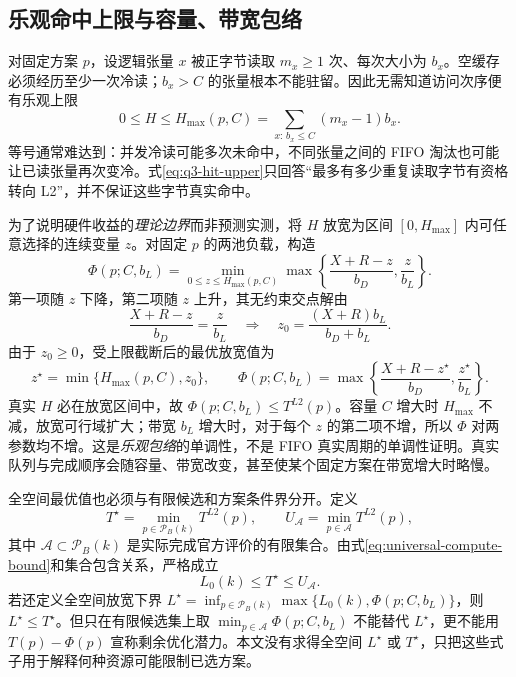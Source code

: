 \subsection{乐观命中上限与容量、带宽包络}
对固定方案 $p$，设逻辑张量 $x$ 被正字节读取 $m_x\ge1$ 次、每次大小为 $b_x$。空缓存必须经历至少一次冷读；$b_x>C$ 的张量根本不能驻留。因此无需知道访问次序便有乐观上限
\begin{equation}\label{eq:q3-hit-upper}
0\le H\le H_{\max}(p,C)=
\sum_{x:\,b_x\le C}(m_x-1)b_x.
\end{equation}
等号通常难达到：并发冷读可能多次未命中，不同张量之间的 FIFO 淘汰也可能让已读张量再次变冷。式\eqref{eq:q3-hit-upper}只回答“最多有多少重复读取字节有资格转向 L2”，并不保证这些字节真实命中。

为了说明硬件收益的\emph{理论边界}而非预测实测，将 $H$ 放宽为区间 $[0,H_{\max}]$ 内可任意选择的连续变量 $z$。对固定 $p$ 的两池负载，构造
\begin{equation}\label{eq:q3-relaxed-envelope}
\Phi(p;C,b_L)=
\min_{0\le z\le H_{\max}(p,C)}
\max\left\{\frac{X+R-z}{b_D},\frac{z}{b_L}\right\}.
\end{equation}
第一项随 $z$ 下降，第二项随 $z$ 上升，其无约束交点解由
\[
\frac{X+R-z}{b_D}=\frac{z}{b_L}
\quad\Longrightarrow\quad
z_0=\frac{(X+R)b_L}{b_D+b_L}.
\]
由于 $z_0\ge0$，受上限截断后的最优放宽值为
\begin{equation}\label{eq:q3-envelope-optimum}
z^\star=\min\{H_{\max}(p,C),z_0\},\qquad
\Phi(p;C,b_L)
=\max\left\{\frac{X+R-z^\star}{b_D},\frac{z^\star}{b_L}\right\}.
\end{equation}
真实 $H$ 必在放宽区间中，故 $\Phi(p;C,b_L)\le T^{L2}(p)$。容量 $C$ 增大时 $H_{\max}$ 不减，放宽可行域扩大；带宽 $b_L$ 增大时，对于每个 $z$ 的第二项不增，所以 $\Phi$ 对两参数均不增。这是\emph{乐观包络}的单调性，不是 FIFO 真实周期的单调性证明。真实队列与完成顺序会随容量、带宽改变，甚至使某个固定方案在带宽增大时略慢。

全空间最优值也必须与有限候选和方案条件界分开。定义
\begin{equation}\label{eq:q3-optimality-sandwich}
T^\star=\min_{p\in\mathcal P_B(k)}T^{L2}(p),\qquad
U_{\mathcal A}=\min_{p\in\mathcal A}T^{L2}(p),
\end{equation}
其中 $\mathcal A\subset\mathcal P_B(k)$ 是实际完成官方评价的有限集合。由式\eqref{eq:universal-compute-bound}和集合包含关系，严格成立
\begin{equation}\label{eq:q3-bound-order}
L_0(k)\le T^\star\le U_{\mathcal A}.
\end{equation}
若还定义全空间放宽下界 $L^\star=\inf_{p\in\mathcal P_B(k)}\max\{L_0(k),\Phi(p;C,b_L)\}$，则 $L^\star\le T^\star$。但只在有限候选集上取 $\min_{p\in\mathcal A}\Phi(p;C,b_L)$ 不能替代 $L^\star$，更不能用 $T(p)-\Phi(p)$ 宣称剩余优化潜力。本文没有求得全空间 $L^\star$ 或 $T^\star$，只把这些式子用于解释何种资源可能限制已选方案。


